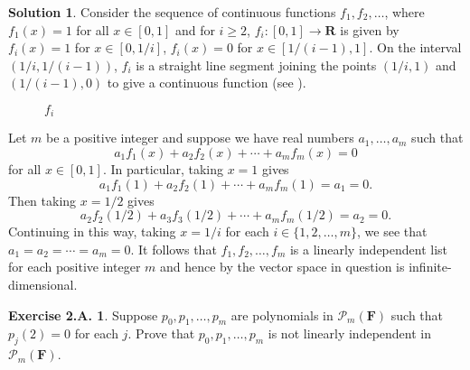 \documentclass[12pt]{article}
\theoremstyle{definition}
\theoremstyle{exercise}
\newtheorem{exercise}{Exercise 2.A.}
\theoremstyle{solution}
\newtheorem*{solution}{Solution}
\newcommand{\R}{\mathbf{R}}
\newcommand{\F}{\mathbf{F}}
\begin{document}
\begin{solution}
    Consider the sequence of continuous functions \( f_1, f_2, \ldots \), where \( f_1(x) = 1 \) for all \( x \in [0, 1] \) and for \( i \geq 2 \), \( f_i : [0, 1] \to \R \) is given by \( f_i(x) = 1 \) for \( x \in [0, 1/i] \), \( f_i(x) = 0 \) for \( x \in [1/(i-1), 1] \). On the interval \( (1/i, 1/(i-1)) \), \( f_i \) is a straight line segment joining the points \( (1/i, 1) \) and \( (1/(i-1), 0) \) to give a continuous function (see ).

    \begin{figure}[h]
        \centering
        \caption{$f_i$} \label{fig:1}
    \end{figure}
    
    \noindent Let \( m \) be a positive integer and suppose we have real numbers \( a_1, \ldots, a_m \) such that
    \[
        a_1 f_1(x) + a_2 f_2(x) + \cdots + a_m f_m(x) = 0
    \]
    for all \( x \in [0, 1] \). In particular, taking \( x = 1 \) gives
    \[
        a_1 f_1(1) + a_2 f_2(1) + \cdots + a_m f_m(1) = a_1 = 0.
    \]
    Then taking \( x = 1/2 \) gives
    \[
        a_2 f_2(1/2) + a_3 f_3(1/2) + \cdots + a_m f_m(1/2) = a_2 = 0.
    \]
    Continuing in this way, taking \( x = 1/i \) for each \( i \in \{ 1, 2, \ldots, m \} \), we see that \( a_1 = a_2 = \cdots = a_m = 0 \). It follows that \( f_1, f_2, \ldots, f_m \) is a linearly independent list for each positive integer \( m \) and hence by  the vector space in question is infinite-dimensional.
\end{solution}

\begin{exercise}
\label{ex:17}
    Suppose \( p_0, p_1, \ldots, p_m \) are polynomials in \( \mathcal{P}_m (\F) \) such that \( p_j(2) = 0 \) for each \( j \). Prove that \( p_0, p_1, \ldots, p_m \) is not linearly independent in \( \mathcal{P}_m (\F) \).
\end{exercise}
\end{document}
